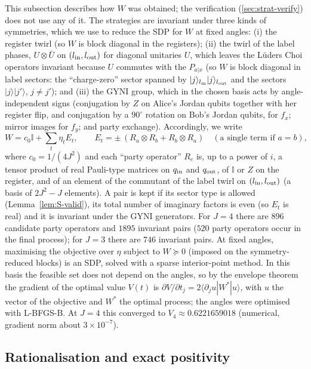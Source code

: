 \documentclass[aps,pra,onecolumn,notitlepage,superscriptaddress,longbibliography,nofootinbib,11pt]{revtex4-2}
\theoremstyle{remark}
\newcommand{\ket}[1]{\lvert #1\rangle}
\newcommand{\one}{\mathbb{I}}
\begin{document}
This subsection describes how $W$ was obtained; the verification (\ref{sec:strat-verify}) does not use any of it. The strategies are invariant under three kinds of symmetries, which we use to reduce the SDP for $W$ at fixed angles: (i) the register twirl (so $W$ is block diagonal in the registers); (ii) the twirl of the label phases, $U\otimes\bar U$ on $(l_{\rm in},l_{\rm out})$ for diagonal unitaries $U$, which leaves the L\"uders Choi operators invariant because $U$ commutes with the $P_{a|x}$ (so $W$ is block diagonal in label sectors: the ``charge-zero'' sector spanned by $\ket{j}_{l_{\rm in}}\ket{j}_{l_{\rm out}}$ and the sectors $\ket{j}\ket{j'}$, $j\neq j'$); and (iii) the GYNI group, which in the chosen basis acts by angle-independent signs (conjugation by $Z$ on Alice's Jordan qubits together with her register flip, and conjugation by a $90^\circ$ rotation on Bob's Jordan qubits, for $f_x$; mirror images for $f_y$; and party exchange). Accordingly, we write
\begin{equation}
W=c_0\one+\sum_t\eta_tE_t,\qquad E_t=\pm\,(R_a\otimes R_b+R_b\otimes R_a)\quad(\text{a single term if }a=b),
\end{equation}
where $c_0=1/(4J^2)$ and each ``party operator'' $R_e$ is, up to a power of $i$, a tensor product of real Pauli-type matrices on $q_{\rm in}$ and $q_{\rm out}$, of $\one$ or $Z$ on the register, and of an element of the commutant of the label twirl on $(l_{\rm in},l_{\rm out})$ (a basis of $2J^2-J$ elements). A pair is kept if its sector type is allowed (Lemma~\ref{lem:S-valid}), its total number of imaginary factors is even (so $E_t$ is real) and it is invariant under the GYNI generators. For $J=4$ there are $896$ candidate party operators and $1895$ invariant pairs ($520$ party operators occur in the final process); for $J=3$ there are $746$ invariant pairs. At fixed angles, maximising the objective over $\eta$ subject to $W\succeq0$ (imposed on the symmetry-reduced blocks) is an SDP, solved with a sparse interior-point method. In this basis the feasible set does not depend on the angles, so by the envelope theorem the gradient of the optimal value $V(t)$ is $\partial V/\partial t_j=2\langle\partial_ju|W^\ast|u\rangle$, with $u$ the vector of the objective and $W^\ast$ the optimal process; the angles were optimised with L-BFGS-B. At $J=4$ this converged to $V_4\approx0.6221659018$ (numerical, gradient norm about $3\times10^{-7}$).

\subsection{Rationalisation and exact positivity}
\end{document}
